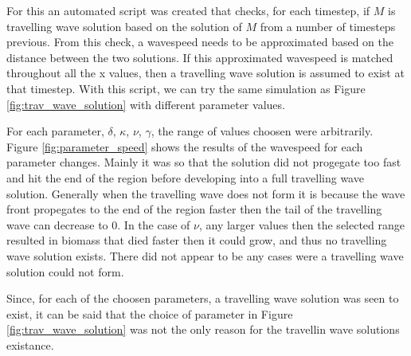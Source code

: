 For this an automated script was created that checks, for each timestep, if $M$ is travelling wave solution based on the solution of $M$ from a number of timesteps previous.
From this check, a wavespeed needs to be approximated based on the distance between the two solutions.
If this approximated wavespeed is matched throughout all the x values, then a travelling wave solution is assumed to exist at that timestep.
With this script, we can try the same simulation as Figure \ref{fig:trav_wave_solution} with different parameter values.

For each parameter, $\delta$, $\kappa$, $\nu$, $\gamma$, the range of values choosen were arbitrarily.
Figure \ref{fig:parameter_speed} shows the results of the wavespeed for each parameter changes.
Mainly it was so that the solution did not progegate too fast and hit the end of the region before developing into a full travelling wave solution.
Generally when the travelling wave does not form it is because the wave front propegates to the end of the region faster then the tail of the travelling wave can decrease to 0.
In the case of $\nu$, any larger values then the selected range resulted in biomass that died faster then it could grow, and thus no travelling wave solution exists.
There did not appear to be any cases were a travelling wave solution could not form.

Since, for each of the choosen parameters, a travelling wave solution was seen to exist, it can be said that the choice of parameter in Figure \ref{fig:trav_wave_solution} was not the only reason for the travellin wave solutions existance.



